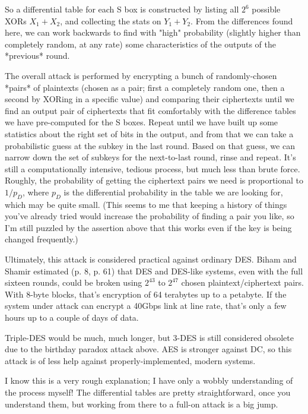 So a differential table for each S box is constructed by listing all
$2^6$ possible XORs $X_1 + X_2$, and collecting the stats on $Y_1 +
Y_2$.  From the differences found here, we can work backwards to find
with "high" probability (slightly higher than completely random, at
any rate) some characteristics of the outputs of the *previous*
round. 

The overall attack is performed by encrypting a bunch of
randomly-chosen *pairs* of plaintexts (chosen as a pair; first a
completely random one, then a second by XORing in a specific value)
and comparing their ciphertexts until we find an output pair of
ciphertexts that fit comfortably with the difference tables we have
pre-computed for the S boxes.  Repeat until we have built up some
statistics about the right set of bits in the output, and from that we
can take a probabilistic guess at the subkey in the last round.  Based
on that guess, we can narrow down the set of subkeys for the
next-to-last round, rinse and repeat.  It's still a computationally
intensive, tedious process, but much less than brute force.  Roughly,
the probability of getting the ciphertext pairs we need is
proportional to $1/p_D$, where $p_D$ is the differential probability in
the table we are looking for, which may be quite small.
(This seems to me that keeping a history of things you've already
tried would increase the probability of finding a pair you like, so
I'm still puzzled by the assertion above that this works even if the
key is being changed frequently.) \aono{}

Ultimately, this attack is considered practical against ordinary DES.
Biham and Shamir estimated (p. 8, p. 61) that DES and DES-like
systems, even with the full sixteen rounds, could be broken using
$2^{43}$ to $2^{47}$ chosen plaintext/ciphertext pairs.  With 8-byte
blocks, that's encryption of 64 terabytes up to a petabyte.  If the
system under attack can encrypt a 40Gbps link at line rate, that's
only a few hours up to a couple of days of data.

Triple-DES would be much, much longer, but 3-DES is still considered
obsolete due to the birthday paradox attack above.  AES is stronger
against DC, so this attack is of less help against
properly-implemented, modern systems.

\aono{} 
I know this is a very rough explanation; I have only a wobbly
understanding of the process myself!  The differential tables are
pretty straightforward, once you understand them, but working from
there to a full-on attack is a big jump.

